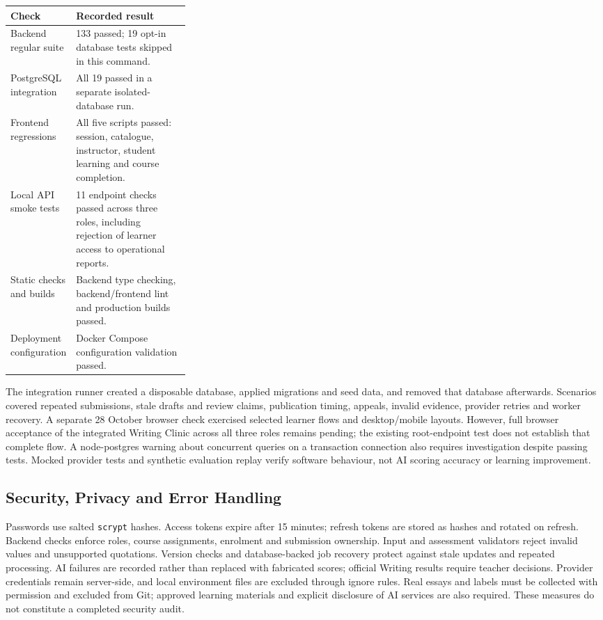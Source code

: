 \begin{center}
\begingroup
\small
\begin{tabularx}{\linewidth}{@{}p{0.30\linewidth}X@{}}
\toprule
\textbf{Check} & \textbf{Recorded result} \\
\midrule
Backend regular suite & 133 passed; 19 opt-in database tests skipped in this command. \\
PostgreSQL integration & All 19 passed in a separate isolated-database run. \\
Frontend regressions & All five scripts passed: session, catalogue, instructor, student learning and course completion. \\
Local API smoke tests & 11 endpoint checks passed across three roles, including rejection of learner access to operational reports. \\
Static checks and builds & Backend type checking, backend/frontend lint and production builds passed. \\
Deployment configuration & Docker Compose configuration validation passed. \\
\bottomrule
\end{tabularx}
\endgroup
\end{center}

The integration runner created a disposable database, applied migrations and
seed data, and removed that database afterwards. Scenarios covered repeated
submissions, stale drafts and review claims, publication timing, appeals,
invalid evidence, provider retries and worker recovery. A separate 28 October
browser check exercised selected learner flows and desktop/mobile layouts.
However, full browser acceptance of the integrated Writing Clinic across all
three roles remains pending; the existing root-endpoint test does not
establish that complete flow. A node-postgres warning about concurrent queries
on a transaction connection also requires investigation despite passing tests.
Mocked provider tests and synthetic evaluation replay verify software behaviour,
not AI scoring accuracy or learning improvement.

\subsection{Security, Privacy and Error Handling}
Passwords use salted \texttt{scrypt} hashes. Access tokens expire after
15 minutes; refresh tokens are stored as hashes and rotated on refresh.
Backend checks enforce roles, course assignments, enrolment and submission
ownership. Input and assessment validators reject invalid values and
unsupported quotations. Version checks and database-backed job recovery
protect against stale updates and repeated processing. AI failures are
recorded rather than replaced with fabricated scores; official Writing
results require teacher decisions. Provider credentials remain server-side,
and local environment files are excluded through ignore rules. Real essays
and labels must be collected with permission and excluded from Git; approved
learning materials and explicit disclosure of AI services are also required.
These measures do not constitute a completed security audit.


